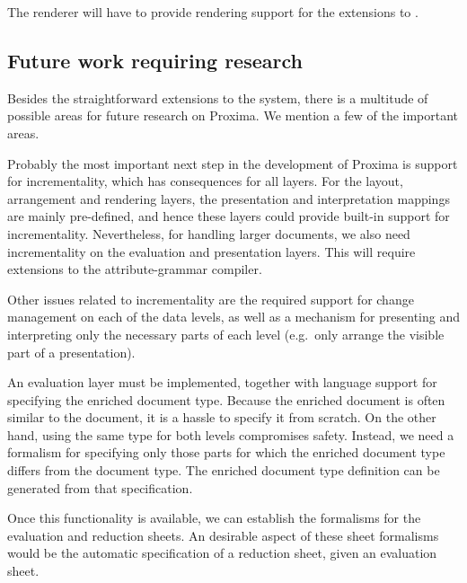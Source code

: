 
The renderer will have to provide rendering support for the extensions to {\Xprez}.

\subsection{Future work requiring research}

Besides the straightforward extensions to the system, there is a multitude of possible areas for future research on Proxima. We mention a few of the important areas.

 Probably the most important next step in the development of Proxima is support for incrementality, which has consequences for all layers. For the layout, arrangement and rendering layers, the presentation and interpretation mappings are mainly pre-defined, and hence these layers could provide built-in support for incrementality. Nevertheless, for handling larger documents, we also need incrementality on the evaluation and presentation layers. This will require extensions to the attribute-grammar compiler. 


Other issues related to incrementality are the required support for change management on each of the data levels, as well as a mechanism for presenting and interpreting only the necessary parts of each level (e.g.\ only arrange the visible part of a presentation).



 An evaluation layer must be implemented, together with language support for specifying the enriched document type. Because the enriched document is often similar to the document, it is a hassle to specify it from scratch. On the other hand, using the same type for both levels compromises safety. Instead, we need a formalism for specifying only those parts for which the enriched document type differs from the document type. The enriched document type definition can be generated from that specification.

Once this functionality is available, we can establish the formalisms for the evaluation and reduction sheets. An desirable aspect of these sheet formalisms would be the automatic specification of a reduction sheet, given an evaluation sheet.

